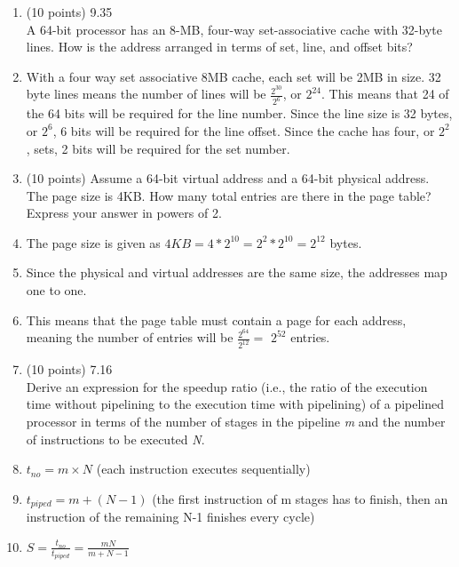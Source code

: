\documentclass[letterpaper,10pt,onecolumn,titlepage]{article}
\begin{document}
\begin{enumerate}
\item (10 points) 9.35 \\
	A 64-bit processor has an 8-MB, four-way set-associative cache with 32-byte lines.
	How is the address arranged in terms of set, line, and offset bits?
\item[\textbullet] With a four way set associative 8MB cache, each set will be 2MB in
	size. 32 byte lines means the number of lines will be $\frac{2^{30}}{2^{6}}$, or
	$2^{24}$. This means that 24 of the 64 bits will be required for the line number.
	Since the line size is 32 bytes, or $2^{6}$, 6 bits will be required for the line
	offset. Since the cache has four, or $2^{2}$, sets, 2 bits will be required for
	the set number.

\item (10 points) Assume a 64-bit virtual address and a 64-bit physical address. The page
	size is 4KB. How many total entries are there in the page table? Express your
	answer in powers of 2.
\item[\textbullet] The page size is given as $4KB = 4*2^{10} = 2^{2}*2^{10} = 2^{12}$ 
	bytes.
\item[\textbullet] Since the physical and virtual addresses are the same size, the
	addresses map one to one.
\item[\textbullet] This means that the page table must contain a page for each address,
	meaning the number of entries will be $\frac{2^{64}}{2^{12}} =$ $2^{52}$ entries.

\item (10 points) 7.16  \\
	Derive an expression for the speedup ratio (i.e., the ratio of the execution time
	without pipelining to the execution time with pipelining) of a pipelined processor
	in terms of the number of stages in the pipeline \textit{m} and the number of
	instructions to be executed \textit{N}.
\item[\textbullet] $t_{no} = m \times N$ (each instruction executes sequentially)
\item[\textbullet] $t_{piped} = m + (N - 1)$ (the first instruction of m stages has to 
	finish, then an instruction of the remaining N-1 finishes every cycle)
\item[\textbullet] $S = \frac{t_{no}}{t_{piped}} = \frac{mN}{m+N-1}$


\end{enumerate}
\end{document}
